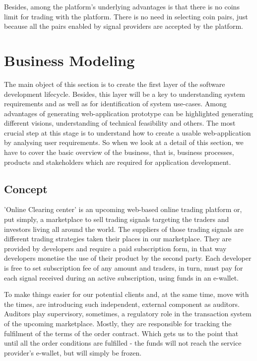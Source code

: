 \documentclass[thesis=B,english]{FITthesis}[2019/03/06]
\begin{document}
Besides, among the platform's underlying advantages is that there is no coins limit for trading with the platform. There is no need in selecting coin pairs, just because all the pairs enabled by signal providers are accepted by the platform.

\section{Business Modeling}
The main object of this section is to create the first layer of the software development lifecycle. Besides, this layer will be a key to understanding system requirements and as well as for identification of system use-cases.
Among advantages of generating web-application prototype can be highlighted generating different visions, understanding of technical feasibility and others.
The most crucial step at this stage is to understand how to create a usable web-application by analysing user requirements.
So when we look at a detail of this section, we have to cover the basic overview of the business, that is, business processes, products and stakeholders which are required for application development.

\subsection{Concept}
'Online Clearing center' is an upcoming web-based online trading platform or, put simply, a marketplace to sell trading signals targeting the traders and investors living all around the world. The suppliers of those trading signals are different trading strategies taken their places in our marketplace. They are provided by developers and require a paid subscription form, in that way developers monetise the use of their product by the second party. Each developer is free to set subscription fee of any amount and traders, in turn, must pay for each signal received during an active subscription, using funds in an e-wallet. 

To make things easier for our potential clients and, at the same time, move with the times, are introducing such independent, external component as auditors. Auditors play supervisory, sometimes, a regulatory role in the transaction system of the upcoming marketplace. Mostly, they are responsible for tracking the fulfilment of the terms of the order contract. Which gets us to the point that until all the order conditions are fulfilled - the funds will not reach the service provider’s e-wallet, but will simply be frozen.
\end{document}
